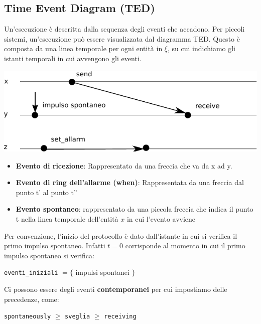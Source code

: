 \subsection*{Time Event Diagram (TED)}
Un'esecuzione è descritta dalla sequenza degli eventi che accadono. Per piccoli
sistemi, un'esecuzione può essere visualizzata dal diagramma TED. Questo è
composta da una linea temporale per ogni entità in $\xi$, su cui indichiamo gli
istanti temporali in cui avvengono gli eventi.
\begin{center}
    \includegraphics[scale=0.8]{images/n_07}
\end{center}

\begin{itemize}
    \item \textbf{Evento di ricezione}: Rappresentato da una freccia che va da x
          ad y.
    \item \textbf{Evento di ring dell'allarme (when)}: Rappresentata da una
          freccia dal punto t' al punto t''
    \item \textbf{Evento spontaneo}: rappresentato da una piccola freccia che
          indica il punto t nella linea temporale dell'entità $x$ in cui l'evento
          avviene
\end{itemize}

Per convenzione, l'inizio del protocollo è dato dall'istante in cui si verifica
il primo impulso spontaneo. Infatti $t=0$ corrisponde al momento in cui il primo
impulso spontaneo si verifica:
\begin{center}
    \texttt{eventi\_iniziali} $=\lbrace$ impulsi spontanei $\rbrace$
\end{center}
Ci possono essere degli eventi \textbf{contemporanei} per cui impostiamo delle
precedenze, come:
\begin{center}
    \texttt{spontaneously} $\geq$ \texttt{sveglia} $\geq$ \texttt{receiving}
\end{center}

